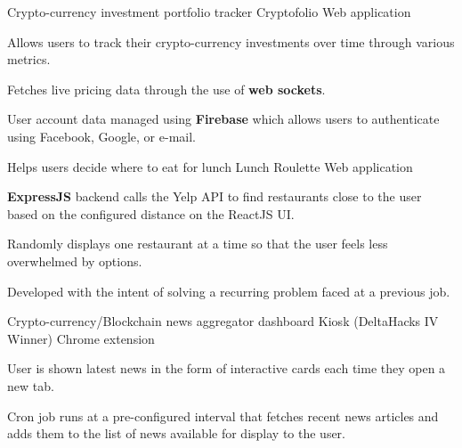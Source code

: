


\begin{cventries}


\cventry
{Crypto-currency investment portfolio tracker} %
{Cryptofolio \href{https://github.com/kdelalic/Cryptofolio}{\faGithub}} %
{Web application}
{}
{ %
\begin{cvitems}
\item {Allows users to track their crypto-currency investments over time through various metrics.}
\item {Fetches live pricing data through the use of \textbf{web sockets}.}
\item {User account data managed using \textbf{Firebase} which allows users to authenticate using Facebook, Google, or e-mail.}
\end{cvitems}
}


\cventry
{Helps users decide where to eat for lunch} %
{Lunch Roulette \href{https://github.com/kdelalic/lunch-roulette}{\faGithub}} %
{Web application}
{}
{ %
\begin{cvitems}
\item {\textbf{ExpressJS} backend calls the Yelp API to find restaurants close to the user based on the configured distance on the ReactJS UI.}
\item {Randomly displays one restaurant at a time so that the user feels less overwhelmed by options.}
\item {Developed with the intent of solving a recurring problem faced at a previous job.}
\end{cvitems}
}


\cventry
{Crypto-currency/Blockchain news aggregator dashboard} %
{Kiosk (DeltaHacks IV Winner)  \href{https://github.com/kdelalic/kiosk}{\faGithub}} %
{Chrome extension}
{}
{ %
\begin{cvitems}
\item {User is shown latest news in the form of interactive cards each time they open a new tab.}
\item {Cron job runs at a pre-configured interval that fetches recent news articles and adds them to the list of news available for display to the user.}
\end{cvitems}
}


\end{cventries}
